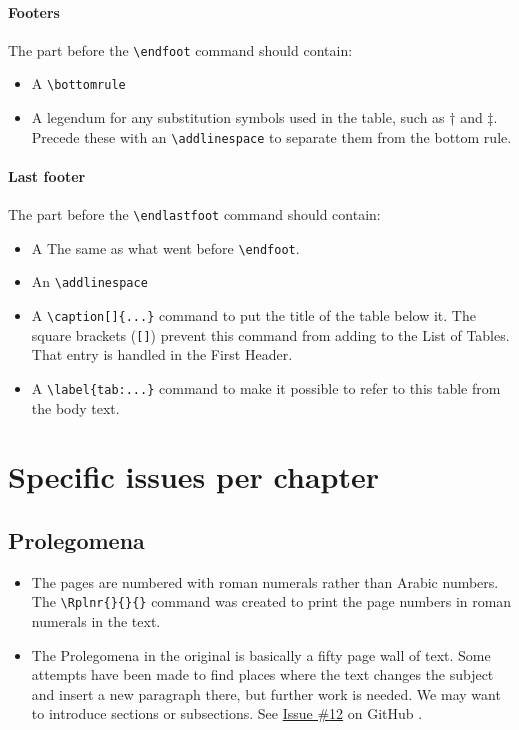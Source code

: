 \documentclass{report}
\newcommand{\SeeIssue}[1]{%
See \textcolor{blue}{%
\href{https://github.com/DomoViridi/Scaliger/issues/#1}%
{Issue \#{#1}}%
} on GitHub%
}
\begin{document}
\subsubsection{Footers}
The part before the \verb+\endfoot+ command should contain:
\begin{itemize}
\item A \verb+\bottomrule+
\item A legendum for any substitution symbols used in the table,
such as \super† and \super‡.
Precede these with an \verb+\addlinespace+ to separate them from the bottom
rule.
\end{itemize}

\subsubsection{Last footer}
The part before the \verb+\endlastfoot+ command should contain:
\begin{itemize}
\item A The same as what went before \verb+\endfoot+.
\item An \verb+\addlinespace+
\item A \verb+\caption[]{...}+ command to put the title of the table below it.
The square brackets (\verb+[]+) prevent this command from adding to the List
of Tables. That entry is handled in the First Header.
\item A \verb+\label{tab:...}+ command to make it possible to refer to this
table from the body text.
\end{itemize}


\chapter{Specific issues per chapter}

\section{Prolegomena}
\begin{itemize}
\item
The pages are numbered with roman numerals rather than Arabic numbers.
The \verb+\Rplnr{}{}{}+ command
was created to print the page numbers in roman numerals in the text.
\item
The Prolegomena in the original is basically a fifty page wall of text.
Some attempts have been made to find places where the text changes the subject
and insert a new paragraph there, but further work is needed.
We may want to introduce sections or subsections.
\SeeIssue{12}.
\end{itemize}
\end{document}
